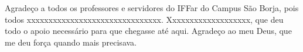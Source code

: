 \begin{agradecimentos}
Agradeço a todos os professores e servidores do IFFar do Campus São Borja, pois todos xxxxxxxxxxxxxxxxxxxxxxxxxxxxxxx. Xxxxxxxxxxxxxxxxxxx, que deu todo o apoio necessário para que chegasse até aqui. Agradeço ao meu Deus, que me deu força quando mais precisava.
\end{agradecimentos}